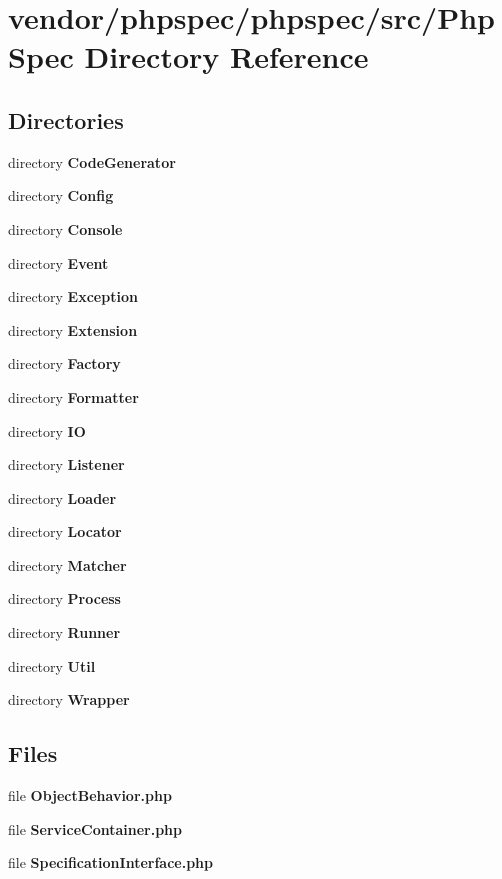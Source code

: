 \section{vendor/phpspec/phpspec/src/\+Php\+Spec Directory Reference}
\label{dir_a56e506427a1cea8af9ed00114f31789}
\subsection*{Directories}
\begin{DoxyCompactItemize}
\item 
directory {\bf Code\+Generator}
\item 
directory {\bf Config}
\item 
directory {\bf Console}
\item 
directory {\bf Event}
\item 
directory {\bf Exception}
\item 
directory {\bf Extension}
\item 
directory {\bf Factory}
\item 
directory {\bf Formatter}
\item 
directory {\bf I\+O}
\item 
directory {\bf Listener}
\item 
directory {\bf Loader}
\item 
directory {\bf Locator}
\item 
directory {\bf Matcher}
\item 
directory {\bf Process}
\item 
directory {\bf Runner}
\item 
directory {\bf Util}
\item 
directory {\bf Wrapper}
\end{DoxyCompactItemize}
\subsection*{Files}
\begin{DoxyCompactItemize}
\item 
file {\bf Object\+Behavior.\+php}
\item 
file {\bf Service\+Container.\+php}
\item 
file {\bf Specification\+Interface.\+php}
\end{DoxyCompactItemize}
